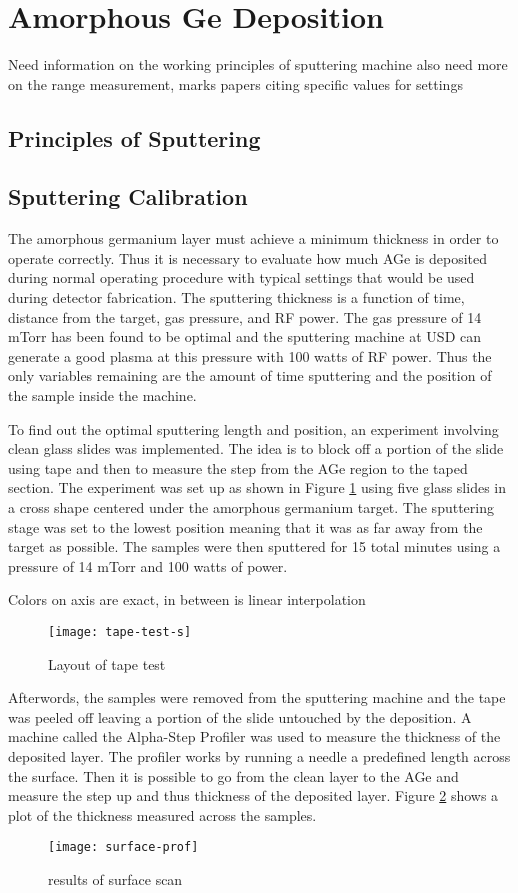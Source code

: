 \section{Amorphous Ge Deposition}

Need information on the working principles of sputtering machine
also need more on the range measurement, marks papers citing specific values for settings
\subsection{Principles of Sputtering}

\subsection{Sputtering Calibration}
The amorphous germanium layer must achieve a minimum thickness in order to operate correctly.
Thus it is necessary to evaluate how much AGe is deposited during normal operating procedure with typical settings that would be used during detector fabrication.
The sputtering thickness is a function of time, distance from the target, gas pressure, and RF power.
The gas pressure of 14 mTorr has been found to be optimal and the sputtering machine at USD can generate a good plasma at this pressure with 100 watts of RF power.
Thus the only variables remaining are the amount of time sputtering and the position of the sample inside the machine.

To find out the optimal sputtering length and position, an experiment involving clean glass slides was implemented.
The idea is to block off a portion of the slide using tape and then to measure the step from the AGe region to the taped section.
The experiment was set up as shown in Figure \ref{fig:tape-test-s} using five glass slides in a cross shape centered under the amorphous germanium target.
The sputtering stage was set to the lowest position meaning that it was as far away from the target as possible.
The samples were then sputtered for 15 total minutes using a pressure of 14 mTorr and 100 watts of power.

Colors on axis are exact, in between is linear interpolation 
\begin{figure}[htpb]
\centering
\texttt{[image: tape-test-s]}
\caption{Layout of tape test}
\label{fig:tape-test-s}
\end{figure}

Afterwords, the samples were removed from the sputtering machine and the tape was peeled off leaving a portion of the slide untouched by the deposition.
A machine called the Alpha-Step Profiler was used to measure the thickness of the deposited layer.
The profiler works by running a needle a predefined length across the surface.
Then it is possible to go from the clean layer to the AGe and measure the step up and thus thickness of the deposited layer.
Figure \ref{fig:surface-prof} shows a plot of the thickness measured across the samples.
\begin{figure}[htpb]
\centering
\texttt{[image: surface-prof]}
\caption{results of surface scan}
\label{fig:surface-prof}
\end{figure}

